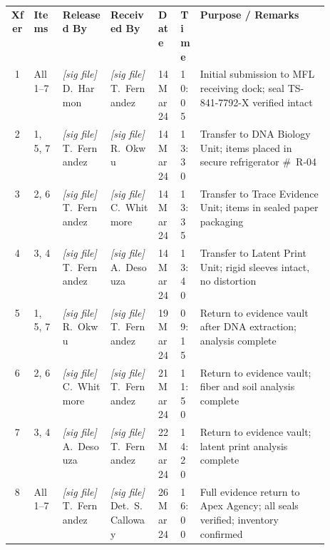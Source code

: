 \documentclass[letterpaper,11pt]{article}
\begin{document}
\begin{tcolorbox}[sectionbox, title={\faPen\quad SEQUENTIAL CUSTODY TRANSFER LOG}]
\small\sffamily
\setlength{\tabcolsep}{3pt}
\renewcommand{\arraystretch}{1.45}
\begin{tabularx}{\linewidth}{@{}c p{0.09\linewidth} p{0.15\linewidth} p{0.15\linewidth}
    p{0.07\linewidth} p{0.06\linewidth} X@{}}
  \rowcolor{ForensicBlue}
  \color{white}\bfseries Xfer &
  \color{white}\bfseries Items &
  \color{white}\bfseries Released By &
  \color{white}\bfseries Received By &
  \color{white}\bfseries Date &
  \color{white}\bfseries Time &
  \color{white}\bfseries Purpose / Remarks \\
  \rowcolor{RowAlt}
  1 & All 1--7 &
    \textit{[sig file]} D.\ Harmon &
    \textit{[sig file]} T.\ Fernandez &
    14 Mar 24 & 10:05 &
    Initial submission to MFL receiving dock; seal TS-841-7792-X verified intact \\
  2 & 1, 5, 7 &
    \textit{[sig file]} T.\ Fernandez &
    \textit{[sig file]} R.\ Okwu &
    14 Mar 24 & 13:30 &
    Transfer to DNA Biology Unit; items placed in secure refrigerator \#~R-04 \\
  \rowcolor{RowAlt}
  3 & 2, 6 &
    \textit{[sig file]} T.\ Fernandez &
    \textit{[sig file]} C.\ Whitmore &
    14 Mar 24 & 13:35 &
    Transfer to Trace Evidence Unit; items in sealed paper packaging \\
  4 & 3, 4 &
    \textit{[sig file]} T.\ Fernandez &
    \textit{[sig file]} A.\ Desouza &
    14 Mar 24 & 13:40 &
    Transfer to Latent Print Unit; rigid sleeves intact, no distortion \\
  \rowcolor{RowAlt}
  5 & 1, 5, 7 &
    \textit{[sig file]} R.\ Okwu &
    \textit{[sig file]} T.\ Fernandez &
    19 Mar 24 & 09:15 &
    Return to evidence vault after DNA extraction; analysis complete \\
  6 & 2, 6 &
    \textit{[sig file]} C.\ Whitmore &
    \textit{[sig file]} T.\ Fernandez &
    21 Mar 24 & 11:50 &
    Return to evidence vault; fiber and soil analysis complete \\
  \rowcolor{RowAlt}
  7 & 3, 4 &
    \textit{[sig file]} A.\ Desouza &
    \textit{[sig file]} T.\ Fernandez &
    22 Mar 24 & 14:20 &
    Return to evidence vault; latent print analysis complete \\
  8 & All 1--7 &
    \textit{[sig file]} T.\ Fernandez &
    \textit{[sig file]} Det.\ S.\ Calloway &
    26 Mar 24 & 16:00 &
    Full evidence return to Apex Agency; all seals verified; inventory confirmed \\
\end{tabularx}
\end{tcolorbox}
\end{document}
